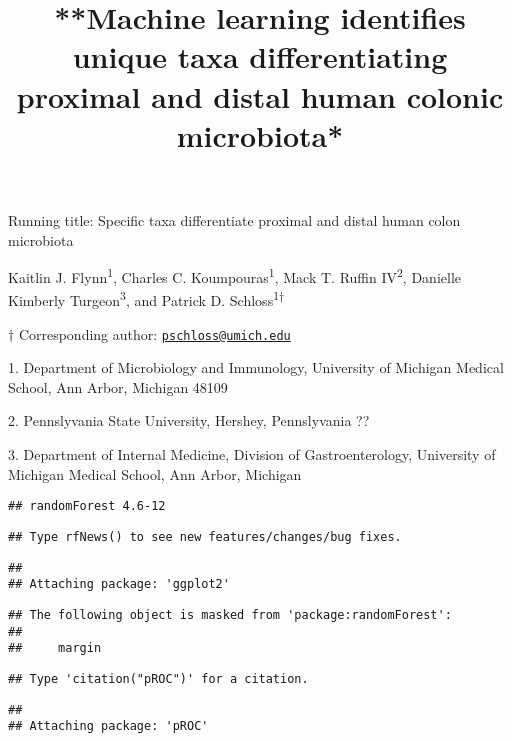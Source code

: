 \documentclass[11pt,]{article}
\title{**Machine learning identifies unique taxa differentiating proximal and
distal human colonic microbiota*}
\author{}
\date{}
\begin{document}
\maketitle

\vspace{35mm}

Running title: Specific taxa differentiate proximal and distal human
colon microbiota

\vspace{35mm}

Kaitlin J. Flynn\textsuperscript{1}, Charles C.
Koumpouras\textsuperscript{1}, Mack T. Ruffin IV\textsuperscript{2},
Danielle Kimberly Turgeon\textsuperscript{3}, and Patrick D.
Schloss\textsuperscript{1\(\dagger\)}

\vspace{35mm}

\(\dagger\) Corresponding author:
\href{mailto:pschloss@umich.edu}{\nolinkurl{pschloss@umich.edu}}

1. Department of Microbiology and Immunology, University of Michigan
Medical School, Ann Arbor, Michigan 48109

2. Pennslyvania State University, Hershey, Pennslyvania ??

3. Department of Internal Medicine, Division of Gastroenterology,
University of Michigan Medical School, Ann Arbor, Michigan

\newpage

\linenumbers

\begin{verbatim}
## randomForest 4.6-12
\end{verbatim}

\begin{verbatim}
## Type rfNews() to see new features/changes/bug fixes.
\end{verbatim}

\begin{verbatim}
## 
## Attaching package: 'ggplot2'
\end{verbatim}

\begin{verbatim}
## The following object is masked from 'package:randomForest':
## 
##     margin
\end{verbatim}

\begin{verbatim}
## Type 'citation("pROC")' for a citation.
\end{verbatim}

\begin{verbatim}
## 
## Attaching package: 'pROC'
\end{verbatim}
\end{document}
